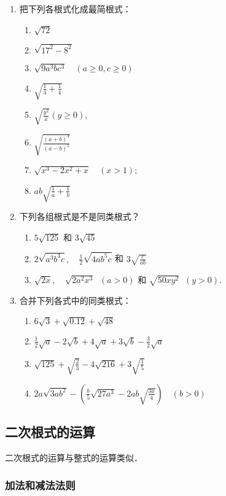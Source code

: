 \begin{ex}
\begin{enumerate}
    \item 把下列各根式化成最简根式：
\begin{enumerate}
    \item $\sqrt{72}$
    \item $\sqrt{17^{2}-8^{2}}$
    \item $\sqrt{9 a^{3} b c^{3}}\quad (a \ge 0, c \ge 0)$
    \item  $\sqrt{\frac{1}{3}+\frac{1}{4}}$
    \item  $\sqrt{\frac{y^{2}}{x}}(y \ge 0)$,
    \item  $\sqrt{\frac{(a+b)^{4}}{(a-b)^{5}}}$
    \item  $\sqrt{x^{3}-2 x^{2}+x}\quad (x>1)$;
    \item $a b \sqrt{\frac{1}{a}+\frac{1}{b}}$
\end{enumerate}
    \item 下列各组根式是不是同类根式？
    \begin{enumerate}
\item $5 \sqrt{125}$ 和 $3 \sqrt{45}$
\item $2 \sqrt{a^{3} b^{3} c},\quad \frac{1}{2} \sqrt{4 a b^{5} c}$ 和 $3 \sqrt{\frac{c}{a b}}$
\item $\sqrt{2 x},\quad \sqrt{2 a^{2} x^{3}}\;\; (a>0)$ 和 $\sqrt{50 x y^{2}}\;\;(y>0)$.
    \end{enumerate}
    \item 合并下列各式中的同类根式：
\begin{enumerate}
    \item $6 \sqrt{3}+\sqrt{0.12}+\sqrt{48}$
    \item $\frac{1}{2} \sqrt{a}- 2 \sqrt{b}+4 \sqrt{a}+3 \sqrt{b}-\frac{3}{2} \sqrt{a}$
    \item $\sqrt{125}+\sqrt{\frac{2}{3}}-4 \sqrt{216}+3 \sqrt{\frac{1}{5}}$
    \item $2 a \sqrt{3 a b^{2}}-\left(\frac{b}{5} \sqrt{27 a^{3}}-2 a b \sqrt{\frac{3a}{4}}\right)\quad (b>0)$
\end{enumerate}
\end{enumerate}
\end{ex}

\subsection{二次根式的运算}
二次根式的运算与整式的运算类似．

\subsubsection{加法和减法法则}

